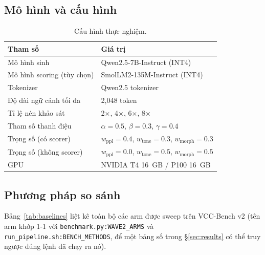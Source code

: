 \documentclass[12pt,a4paper]{article}
\begin{document}
\subsection{Mô hình và cấu hình}

\begin{table}[H]
\centering
\caption{Cấu hình thực nghiệm.}
\label{tab:experiment_setup}
\begin{tabular}{ll}
\toprule
\textbf{Tham số} & \textbf{Giá trị} \\
\midrule
Mô hình sinh & Qwen2.5-7B-Instruct (INT4) \\
Mô hình scoring (tùy chọn) & SmolLM2-135M-Instruct (INT4) \\
Tokenizer & Qwen2.5 tokenizer \\
Độ dài ngữ cảnh tối đa & 2,048 token \\
Tỉ lệ nén khảo sát & 2$\times$, 4$\times$, 6$\times$, 8$\times$ \\
Tham số thanh điệu & $\alpha = 0.5$, $\beta = 0.3$, $\gamma = 0.4$ \\
Trọng số (có scorer) & $w_{\text{ppl}} = 0.4$, $w_{\text{tone}} = 0.3$, $w_{\text{morph}} = 0.3$ \\
Trọng số (không scorer) & $w_{\text{ppl}} = 0.0$, $w_{\text{tone}} = 0.5$, $w_{\text{morph}} = 0.5$ \\
GPU & NVIDIA T4 16~GB / P100 16~GB \\
\bottomrule
\end{tabular}
\end{table}

\subsection{Phương pháp so sánh}

Bảng~\ref{tab:baselines} liệt kê toàn bộ các arm được sweep trên VCC-Bench v2 (tên arm khớp 1-1 với \texttt{benchmark.py:WAVE2\_ARMS} và \texttt{run\_pipeline.sh:BENCH\_METHODS}, để một bảng số trong \S\ref{sec:results} có thể truy ngược đúng lệnh đã chạy ra nó).
\end{document}
